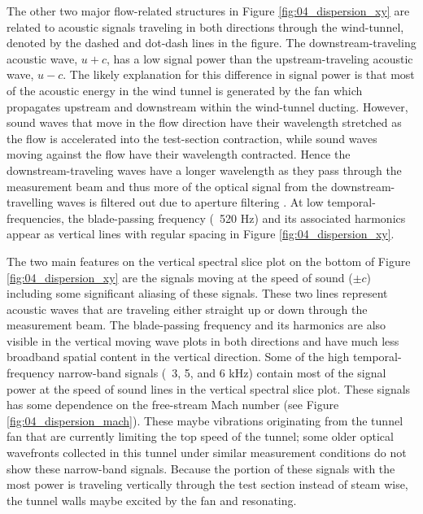 The other two major flow-related structures in Figure \ref{fig:04_dispersion_xy} are related to acoustic signals traveling in both directions through the wind-tunnel, denoted by the dashed and dot-dash lines in the figure.
The downstream-traveling acoustic wave, $u+c$, has a low signal power than the upstream-traveling acoustic wave, $u-c$.
The likely explanation for this difference in signal power is that most of the acoustic energy in the wind tunnel is generated by the fan which propagates upstream and downstream within the wind-tunnel ducting.
However, sound waves that move in the flow direction have their wavelength stretched as the flow is accelerated into the test-section contraction, while sound waves moving against the flow have their wavelength contracted.
Hence the downstream-traveling waves have a longer wavelength as they pass through the measurement beam and thus more of the optical signal from the downstream-travelling waves is filtered out due to aperture filtering \cite{Siegenthaler-2008-9Yutbt6c}.
At low temporal-frequencies, the blade-passing frequency (~520 Hz) and its associated harmonics appear as vertical lines with regular spacing in Figure \ref{fig:04_dispersion_xy}.

The two main features on the vertical spectral slice plot on the bottom of Figure \ref{fig:04_dispersion_xy} are the signals moving at the speed of sound ($\pm c$) including some significant aliasing of these signals.
These two lines represent acoustic waves that are traveling either straight up or down through the measurement beam.
The blade-passing frequency and its harmonics are also visible in the vertical moving wave plots in both directions and have much less broadband spatial content in the vertical direction.
Some of the high temporal-frequency narrow-band signals (~3, 5, and 6 kHz) contain most of the signal power at the speed of sound lines in the vertical spectral slice plot.
These signals has some dependence on the free-stream Mach number (see Figure \ref{fig:04_dispersion_mach}).
These maybe vibrations originating from the tunnel fan that are currently limiting the top speed of the tunnel; some older optical wavefronts collected in this tunnel under similar measurement conditions do not show these narrow-band signals.
Because the portion of these signals with the most power is traveling vertically through the test section instead of steam wise, the tunnel walls maybe excited by the fan and resonating.

